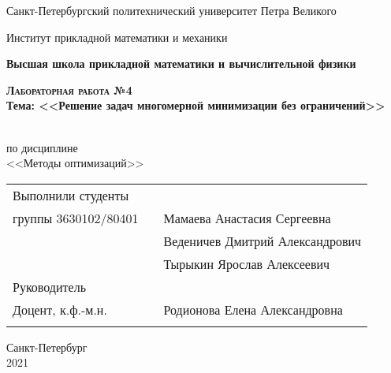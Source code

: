 \documentclass{article}
\begin{document}
\begin{titlepage}
  \begin{center}
  
     
    \large
    
    Санкт-Петербургский политехнический университет Петра Великого
    
    Институт прикладной математики и механики
    
    \textbf{Высшая школа прикладной математики и вычислительной физики}
    
    \vfill
     
     
    \textsc{\textbf{\Large{Лабораторная работа №4}}}\\[5mm]
     
    {\large \textbf{Тема: <<Решение задач многомерной  минимизации без ограничений>>}}
    
    \\ по дисциплине\\ <<Методы оптимизаций>>\\

\end{center}

\vfill


\begin{tabular}{l p{} l}
Выполнили студенты \\группы 3630102/80401   

&  &Мамаева Анастасия Сергеевна\\
&  &Веденичев Дмитрий Александрович\\
&  &Тырыкин Ярослав Алексеевич\\

Руководитель\\Доцент, к.ф.-м.н.& \hspace{0pt} &   Родионова Елена Александровна \\\\
\end{tabular}

\hfill \break
\hfill \break
\begin{center} Санкт-Петербург \\2021 \end{center}
\thispagestyle{empty}
 
\end{titlepage}
\newpage
\begin{center}
    \setcounter{page}{2}
    \tableofcontents  
\end{center}

\newpage
\end{document}
